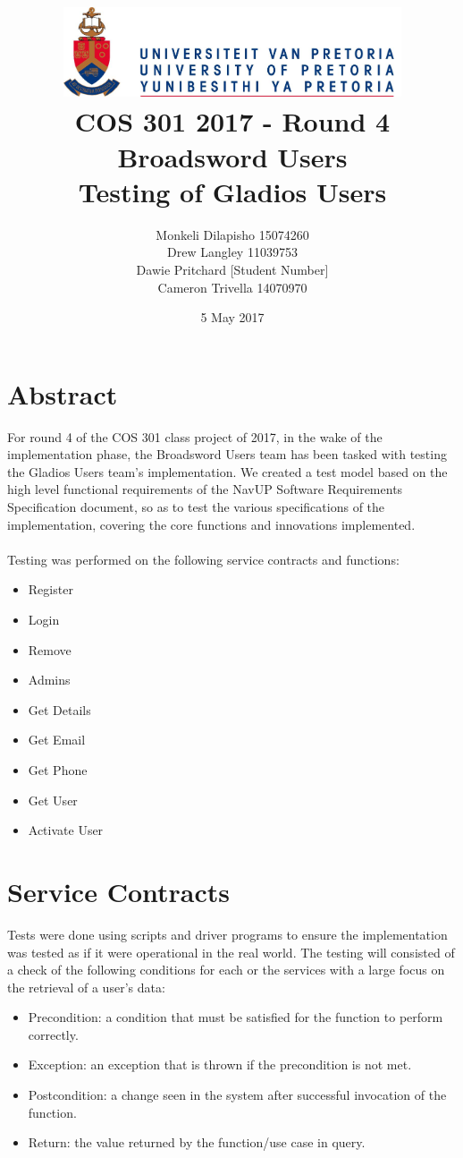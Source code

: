 \documentclass[12pt]{article}
\title{ \includegraphics[width=10cm]{up} \\ [0.5cm] COS 301 2017 - Round 4\\ Broadsword Users\\ Testing of Gladios Users }
\author{Monkeli Dilapisho \hfill 15074260 \\ Drew Langley \hfill 11039753 \\ Dawie Pritchard \hfill [Student Number] \\ Cameron Trivella \hfill 14070970}
\date{5 May 2017}
\begin{document}
\maketitle
\pagebreak
\tableofcontents
\pagebreak


\section{Abstract}
	For round 4 of the COS 301 class project of 2017, in the wake of the implementation phase, the Broadsword Users team has been tasked with testing the Gladios Users team's 		implementation. We created a test model based on the high level functional requirements of the NavUP Software Requirements Specification document, so as to test the various 		specifications of the implementation, covering the core functions and innovations implemented.
	\\ \\
	Testing was performed on the following service contracts and functions:
	
	\begin{itemize}
		\item Register
		\item Login
		\item Remove
		\item Admins
		\item Get Details
		\item Get Email
		\item Get Phone 
		\item Get User
		\item Activate User
	\end{itemize}	

\pagebreak

\section{Service Contracts}
	Tests were done using scripts and driver programs to ensure the implementation was tested as if it were operational in the real world.	
	\noindent The testing will consisted of a check of the following conditions for each or the services with a large focus on the retrieval of a user's data:\\
 	
 	\begin{itemize}
		\item Precondition: a condition that must be satisfied for the function to perform correctly.
		\item Exception: an exception that is thrown if the precondition is not met.
		\item Postcondition: a change seen in the system after successful invocation of the function.
		\item Return: the value returned by the function/use case in query.
	\end{itemize}
		
\end{document}
